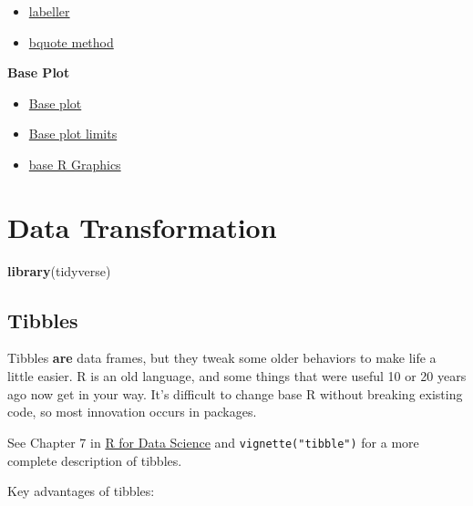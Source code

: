 \documentclass[]{book}
\newenvironment{Shaded}{\begin{snugshade}}{\end{snugshade}}
\newcommand{\KeywordTok}[1]{\textcolor[rgb]{0.13,0.29,0.53}{\textbf{#1}}}
\newcommand{\NormalTok}[1]{#1}
\providecommand{\tightlist}{%
  \setlength{\itemsep}{0pt}\setlength{\parskip}{0pt}}
\theoremstyle{definition}
\theoremstyle{definition}
\theoremstyle{definition}
\theoremstyle{remark}
\let\BeginKnitrBlock\begin \let\EndKnitrBlock\end
\begin{document}
\begin{itemize}
\tightlist
\item
  \href{http://ggplot2.tidyverse.org/reference/label_bquote.html}{labeller}
\item
  \href{https://trinkerrstuff.wordpress.com/2018/03/15/2246/}{bquote
  method}
\end{itemize}

\textbf{Base Plot}

\begin{itemize}
\tightlist
\item
  \href{https://www.stat.auckland.ac.nz/~ihaka/120/Notes/ch03.pdf}{Base
  plot}
\item
  \href{https://www.stat.auckland.ac.nz/~ihaka/787/lectures-r-graphics.pdf}{Base
  plot limits}
\item
  \href{https://blog.jumpingrivers.com/posts/2018/2018-01-24-base-r-graphics/}{base
  R Graphics}
\end{itemize}

\hypertarget{data-transformation}{%
\chapter{Data Transformation}\label{data-transformation}}

\begin{Shaded}
\begin{Highlighting}[]
\KeywordTok{library}\NormalTok{(tidyverse)}
\end{Highlighting}
\end{Shaded}

\hypertarget{tibbles}{%
\section{Tibbles}\label{tibbles}}

Tibbles \textbf{are} data frames, but they tweak some older behaviors to
make life a little easier. R is an old language, and some things that
were useful 10 or 20 years ago now get in your way. It's difficult to
change base R without breaking existing code, so most innovation occurs
in packages.

\BeginKnitrBlock{rmdimportant}
See Chapter 7 in \href{http://r4ds.had.co.nz/tibbles.html}{R for Data
Science} and \texttt{vignette("tibble")} for a more complete description
of tibbles.
\EndKnitrBlock{rmdimportant}

Key advantages of tibbles:
\end{document}
